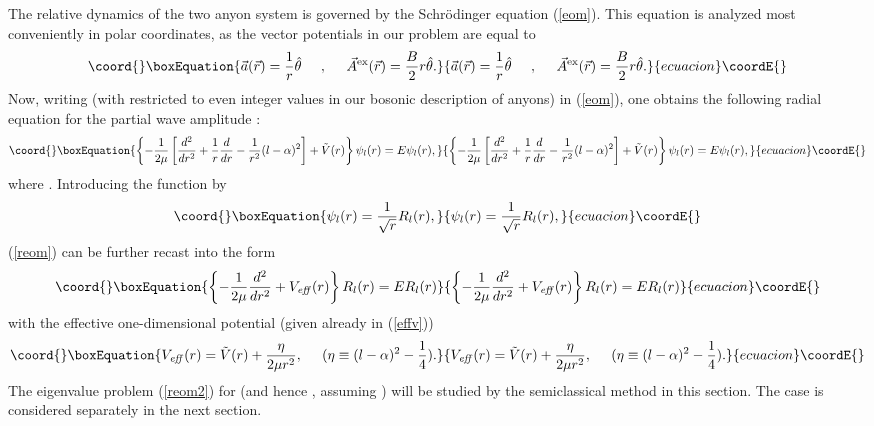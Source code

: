 \documentclass[a4paper,aps,eqsecnum,preprint,preprintnumbers,12pt]{revtex4}
\begin{document}
The relative dynamics of the two anyon system is governed by the
Schr\"{o}dinger equation (\ref{eom}). This equation is analyzed
most conveniently in polar coordinates, as the vector potentials
in our problem are equal to
\begin{equation}\coord{}\boxEquation{
\vec{a}(\vec{r}) = \frac{1}{r} \hat{\theta} \;\;\;\;\; ,
\;\;\;\;\; \vec{A}^{\rm ex}(\vec{r}) = \frac{B}{2} r \hat{\theta}.
}{
\vec{a}(\vec{r}) = \frac{1}{r} \hat{\theta} \;\;\;\;\; ,
\;\;\;\;\; \vec{A}^{\rm ex}(\vec{r}) = \frac{B}{2} r \hat{\theta}.
}{ecuacion}\coordE{}\end{equation}
Now, writing \coordHE{} (with \coordHE{}
restricted to even integer values in our bosonic description of
anyons) in (\ref{eom}), one obtains the following radial equation
for the partial wave amplitude \coordHE{}:
\begin{equation}\coord{}\boxEquation{ \label{reom}
\left\{ -\frac{1}{2\mu} \left[ \frac{d^{2}}{dr^{2}} + \frac{1}{r}
\frac{d}{dr} - \frac{1}{r^{2}} (l-\alpha)^{2} \right] +
\tilde{V}(r) \right\} \psi_{l}(r) = E \psi_{l}(r),
}{ \left\{ -\frac{1}{2\mu} \left[ \frac{d^{2}}{dr^{2}} + \frac{1}{r}
\frac{d}{dr} - \frac{1}{r^{2}} (l-\alpha)^{2} \right] +
\tilde{V}(r) \right\} \psi_{l}(r) = E \psi_{l}(r),
}{ecuacion}\coordE{}\end{equation}
where \coordHE{}. Introducing the
function \coordHE{} by
\begin{equation}\coord{}\boxEquation{
\psi_{l}(r) = \displaystyle \frac{1}{\sqrt{r}} R_{l}(r),
}{
\psi_{l}(r) = \displaystyle \frac{1}{\sqrt{r}} R_{l}(r),
}{ecuacion}\coordE{}\end{equation}
(\ref{reom}) can be further recast into the form
\begin{equation}\coord{}\boxEquation{ \label{reom2}
\left\{ -\frac{1}{2\mu} \frac{d^{2}}{dr^{2}} + V_{\it eff}(r)
\right\} R_{l}(r) = E R_{l}(r)
}{ \left\{ -\frac{1}{2\mu} \frac{d^{2}}{dr^{2}} + V_{\it eff}(r)
\right\} R_{l}(r) = E R_{l}(r)
}{ecuacion}\coordE{}\end{equation}
with the effective one-dimensional potential (given already in
(\ref{effv}))
\begin{equation}\coord{}\boxEquation{ \label{veff}
V_{\it eff}(r) = \tilde{V}(r) + \frac{\eta}{2\mu r^{2}},
\;\;\;\;\; (\eta \equiv (l-\alpha)^{2} - \frac{1}{4}).
}{ V_{\it eff}(r) = \tilde{V}(r) + \frac{\eta}{2\mu r^{2}},
\;\;\;\;\; (\eta \equiv (l-\alpha)^{2} - \frac{1}{4}).
}{ecuacion}\coordE{}\end{equation}
The eigenvalue problem (\ref{reom2}) for \coordHE{} (and hence \coordHE{}, assuming \coordHE{}) will be
studied by the semiclassical method in this section. The \coordHE{}
case is considered separately in the next section.
\end{document}
